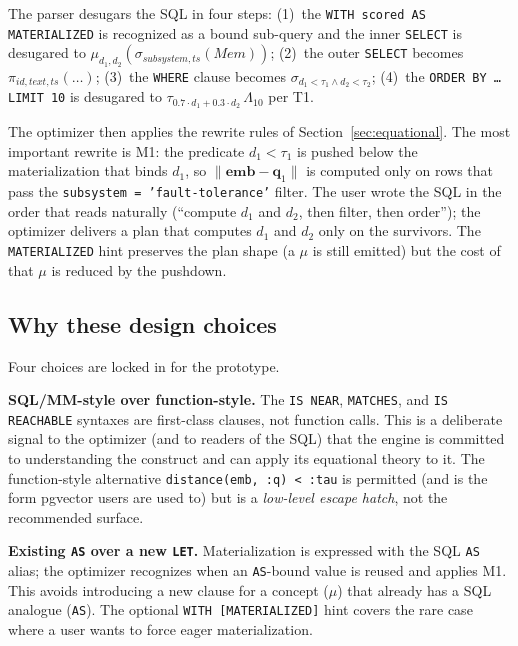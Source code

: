 \documentclass[sigconf,nonacm,review]{acmart}
\theoremstyle{plain}
\theoremstyle{definition}
\newcommand{\vect}[1]{\boldsymbol{#1}}
\newcommand{\Mem}{\mathit{Mem}}
\theoremstyle{remark}
\begin{document}
The parser desugars the SQL in four steps: (1)~the
\texttt{WITH scored AS MATERIALIZED} is recognized as a bound
sub-query and the inner \texttt{SELECT} is desugared to
$\mu_{d_1, d_2}(\sigma_{subsystem, ts}(\Mem))$; (2)~the
outer \texttt{SELECT} becomes $\pi_{id, text, ts}(\ldots)$;
(3)~the \texttt{WHERE} clause becomes
$\sigma_{d_1 < \tau_1 \wedge d_2 < \tau_2}$; (4)~the
\texttt{ORDER BY \ldots LIMIT 10} is desugared to
$\tau_{0.7\cdot d_1 + 0.3\cdot d_2}\, \Lambda_{10}$ per T1.

The optimizer then applies the rewrite rules of
Section~\ref{sec:equational}. The most important rewrite is
M1: the predicate $d_1 < \tau_1$ is pushed below the
materialization that binds $d_1$, so $\lVert\vect{emb} -
\vect{q}_1\rVert$ is computed only on rows that pass the
\texttt{subsystem = 'fault-tolerance'} filter. The user wrote
the SQL in the order that reads naturally (``compute $d_1$
and $d_2$, then filter, then order''); the optimizer delivers
a plan that computes $d_1$ and $d_2$ only on the survivors.
The \texttt{MATERIALIZED} hint preserves the plan shape (a
$\mu$ is still emitted) but the cost of that $\mu$ is reduced
by the pushdown.

\subsection{Why these design choices}\label{sec:sql:why}

Four choices are locked in for the prototype.

\textbf{SQL/MM-style over function-style.} The \texttt{IS NEAR},
\texttt{MATCHES}, and \texttt{IS REACHABLE} syntaxes are
first-class clauses, not function calls. This is a deliberate
signal to the optimizer (and to readers of the SQL) that the
engine is committed to understanding the construct and can
apply its equational theory to it. The function-style
alternative \texttt{distance(emb, :q) < :tau} is permitted
(and is the form pgvector users are used to) but is a
\emph{low-level escape hatch}, not the recommended surface.

\textbf{Existing \texttt{AS} over a new \texttt{LET}.}
Materialization is expressed with the SQL \texttt{AS} alias;
the optimizer recognizes when an \texttt{AS}-bound value is
reused and applies M1. This avoids introducing a new clause
for a concept ($\mu$) that already has a SQL analogue
(\texttt{AS}). The optional \texttt{WITH [MATERIALIZED]} hint
covers the rare case where a user wants to force eager
materialization.
\end{document}
